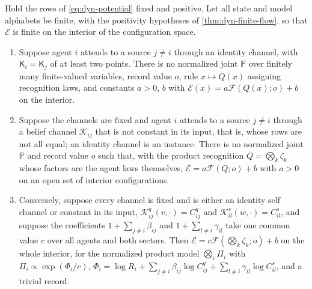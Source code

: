 Hold the rows of \cref{eq:dyn-potential} fixed and positive. Let all state and model alphabets be finite, with the positivity hypotheses of \cref{thm:dyn-finite-flow}, so that $\mathcal E$ is finite on the interior of the configuration space.
\begin{enumerate}
\item[(a)] Suppose agent $i$ attends to a source $j\neq i$ through an identity channel, with $\mathsf K_i=\mathsf K_j$ of at least two points. There is no normalized joint $\mathbb P$ over finitely many finite-valued variables, record value $o$, rule $x\mapsto Q(x)$ assigning recognition laws, and constants $a>0$, $b$ with $\mathcal E(x)=a\mathcal F(Q(x);o)+b$ on the interior.
\item[(b)] Suppose the channels are fixed and agent $i$ attends to a source $j\neq i$ through a belief channel $\mathcal K_{ij}$ that is not constant in its input, that is, whose rows are not all equal; an identity channel is an instance. There is no normalized joint $\mathbb P$ and record value $o$ such that, with the product recognition $Q=\bigotimes_k\zeta_k$ whose factors are the agent laws themselves, $\mathcal E=a\mathcal F(Q;o)+b$ with $a>0$ on an open set of interior configurations.
\item[(c)] Conversely, suppose every channel is fixed and is either an identity self channel or constant in its input, $\mathcal K^q_{ij}(v,\cdot)=C^q_{ij}$ and $\mathcal K^s_{il}(w,\cdot)=C^s_{il}$, and suppose the coefficients $1+\sum_{j\neq i}\beta_{ij}$ and $1+\sum_{l\neq i}\gamma_{il}$ take one common value $c$ over all agents and both sectors. Then $\mathcal E=c\mathcal F(\bigotimes_k\zeta_k;o)+b$ on the whole interior, for the normalized product model $\bigotimes_i\Pi_i$ with $\Pi_i\propto\exp(\Phi_i/c)$, $\Phi_i=\log R_i+\sum_{j\neq i}\beta_{ij}\log C^q_{ij}+\sum_{l\neq i}\gamma_{il}\log C^s_{il}$, and a trivial record.
\end{enumerate}
